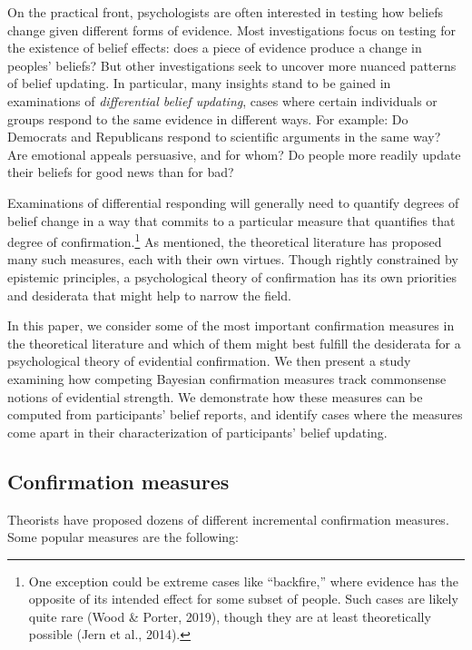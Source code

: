 \documentclass[10pt, letterpaper]{article}
\begin{document}
On the practical front, psychologists are often interested in testing
how beliefs change given different forms of evidence. Most
investigations focus on testing for the existence of belief effects:
does a piece of evidence produce a change in peoples' beliefs? But other
investigations seek to uncover more nuanced patterns of belief updating.
In particular, many insights stand to be gained in examinations of
\emph{differential belief updating}, cases where certain individuals or
groups respond to the same evidence in different ways. For example: Do
Democrats and Republicans respond to scientific arguments in the same
way? Are emotional appeals persuasive, and for whom? Do people more
readily update their beliefs for good news than for bad?

Examinations of differential responding will generally need to quantify
degrees of belief change in a way that commits to a particular measure
that quantifies that degree of confirmation.\footnote{One exception
  could be extreme cases like ``backfire,'' where evidence has the
  opposite of its intended effect for some subset of people. Such cases
  are likely quite rare (Wood \& Porter, 2019), though they are at least
  theoretically possible (Jern et al., 2014).} As mentioned, the
theoretical literature has proposed many such measures, each with their
own virtues. Though rightly constrained by epistemic principles, a
psychological theory of confirmation has its own priorities and
desiderata that might help to narrow the field.

In this paper, we consider some of the most important confirmation
measures in the theoretical literature and which of them might best
fulfill the desiderata for a psychological theory of evidential
confirmation. We then present a study examining how competing Bayesian
confirmation measures track commonsense notions of evidential strength.
We demonstrate how these measures can be computed from participants'
belief reports, and identify cases where the measures come apart in
their characterization of participants' belief updating.

\hypertarget{confirmation-measures}{%
\subsection{Confirmation measures}\label{confirmation-measures}}

Theorists have proposed dozens of different incremental confirmation
measures. Some popular measures are the following:
\end{document}
